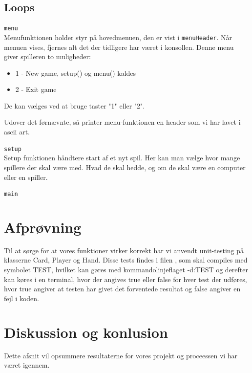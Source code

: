 \documentclass[a4paper]{article}
\begin{document}
    \subsection{Loops} \label{ssec:loops}
    \begin{description}
      \item{\texttt{menu}}~\\
      Menufunktionen holder styr på hovedmenuen, den er vist i \lstinline$menuHeader$.
      Når menuen vises, fjernes alt det der tidligere har været i konsollen.
      Denne menu giver spilleren to muligheder:
      \begin{itemize}
        \item 1 - New game, setup() og menu() kaldes
        \item 2 - Exit game
      \end{itemize}
      De kan vælges ved at bruge taster "1" eller "2".
      
      Udover det førnævnte, så printer menu-funktionen en header som
      vi har lavet i ascii art.

    \item{\texttt{setup}}~\\
      Setup funktionen håndtere start af et nyt spil. Her kan man
      vælge hvor mange spillere der skal være med. Hvad de skal hedde,
      og om de skal være en computer eller en spiller.
      
      \item{\texttt{main}}~\\
        
    \end{description}
      
      
  \section{Afprøvning} \label{sec:unitTest}
    Til at sørge for at vores funktioner virker korrekt har vi
    anvendt unit-testing på klasserne Card, Player og Hand.
    Disse tests findes i filen , som skal
    compiles med symbolet TEST, hvilket kan gøres med
    kommandolinjeflaget -d:TEST og derefter kan køres i en
    terminal, hvor der angives true eller false for hver test
    der udføres, hvor true angiver at testen har givet det
    forventede resultat og false angiver en fejl i koden.

	\section{Diskussion og konlusion} \label{sec:conclusion}
    Dette afsnit vil opsummere resultaterne for vores projekt og proceessen vi har været igennem.
\end{document}
